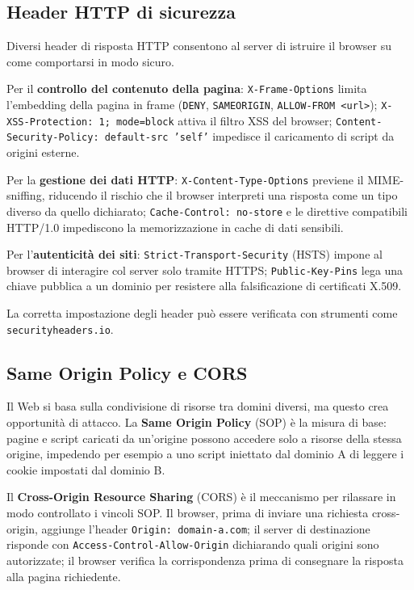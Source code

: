 \documentclass[12pt, a4paper]{report}
\begin{document}
\subsection{Header HTTP di sicurezza}
Diversi header di risposta HTTP consentono al server di istruire il browser su come comportarsi in modo sicuro.

Per il \textbf{controllo del contenuto della pagina}: \texttt{X-Frame-Options} limita l'embedding della pagina in frame (\texttt{DENY}, \texttt{SAMEORIGIN}, \texttt{ALLOW-FROM <url>}); \texttt{X-XSS-Protection: 1; mode=block} attiva il filtro XSS del browser; \texttt{Content-Security-Policy: default-src 'self'} impedisce il caricamento di script da origini esterne.

Per la \textbf{gestione dei dati HTTP}: \texttt{X-Content-Type-Options} previene il MIME-sniffing, riducendo il rischio che il browser interpreti una risposta come un tipo diverso da quello dichiarato; \texttt{Cache-Control: no-store} e le direttive compatibili HTTP/1.0 impediscono la memorizzazione in cache di dati sensibili.

Per l'\textbf{autenticità dei siti}: \texttt{Strict-Transport-Security} (HSTS) impone al browser di interagire col server solo tramite HTTPS; \texttt{Public-Key-Pins} lega una chiave pubblica a un dominio per resistere alla falsificazione di certificati X.509.

La corretta impostazione degli header può essere verificata con strumenti come \texttt{securityheaders.io}.

\subsection{Same Origin Policy e CORS}
Il Web si basa sulla condivisione di risorse tra domini diversi, ma questo crea opportunità di attacco. La \textbf{Same Origin Policy} (SOP) è la misura di base: pagine e script caricati da un'origine possono accedere solo a risorse della stessa origine, impedendo per esempio a uno script iniettato dal dominio A di leggere i cookie impostati dal dominio B.

Il \textbf{Cross-Origin Resource Sharing} (CORS) è il meccanismo per rilassare in modo controllato i vincoli SOP. Il browser, prima di inviare una richiesta cross-origin, aggiunge l'header \texttt{Origin: domain-a.com}; il server di destinazione risponde con \texttt{Access-Control-Allow-Origin} dichiarando quali origini sono autorizzate; il browser verifica la corrispondenza prima di consegnare la risposta alla pagina richiedente.
\end{document}
